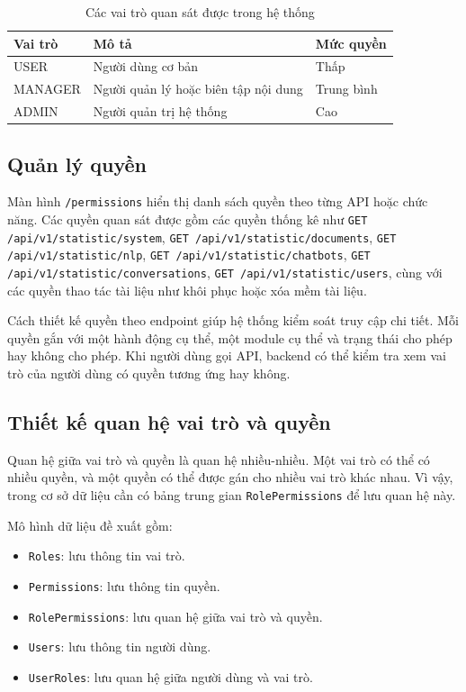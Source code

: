 \begin{table}[H]
\centering
\caption{Các vai trò quan sát được trong hệ thống}
\label{tab:roles-observed}
\begin{tabular}{|p{3cm}|p{6cm}|p{4cm}|}
\hline
\textbf{Vai trò} & \textbf{Mô tả} & \textbf{Mức quyền} \\ \hline
USER & Người dùng cơ bản & Thấp \\ \hline
MANAGER & Người quản lý hoặc biên tập nội dung & Trung bình \\ \hline
ADMIN & Người quản trị hệ thống & Cao \\ \hline
\end{tabular}
\end{table}

\subsection{Quản lý quyền}

Màn hình \texttt{/permissions} hiển thị danh sách quyền theo từng API hoặc chức năng. Các quyền quan sát được gồm các quyền thống kê như \texttt{GET /api/v1/statistic/system}, \texttt{GET /api/v1/statistic/documents}, \texttt{GET /api/v1/statistic/nlp}, \texttt{GET /api/v1/statistic/chatbots}, \texttt{GET /api/v1/statistic/conversations}, \texttt{GET /api/v1/statistic/users}, cùng với các quyền thao tác tài liệu như khôi phục hoặc xóa mềm tài liệu.

Cách thiết kế quyền theo endpoint giúp hệ thống kiểm soát truy cập chi tiết. Mỗi quyền gắn với một hành động cụ thể, một module cụ thể và trạng thái cho phép hay không cho phép. Khi người dùng gọi API, backend có thể kiểm tra xem vai trò của người dùng có quyền tương ứng hay không.

\subsection{Thiết kế quan hệ vai trò và quyền}

Quan hệ giữa vai trò và quyền là quan hệ nhiều-nhiều. Một vai trò có thể có nhiều quyền, và một quyền có thể được gán cho nhiều vai trò khác nhau. Vì vậy, trong cơ sở dữ liệu cần có bảng trung gian \texttt{RolePermissions} để lưu quan hệ này.

Mô hình dữ liệu đề xuất gồm:

\begin{itemize}
    \item \texttt{Roles}: lưu thông tin vai trò.
    \item \texttt{Permissions}: lưu thông tin quyền.
    \item \texttt{RolePermissions}: lưu quan hệ giữa vai trò và quyền.
    \item \texttt{Users}: lưu thông tin người dùng.
    \item \texttt{UserRoles}: lưu quan hệ giữa người dùng và vai trò.
\end{itemize}

